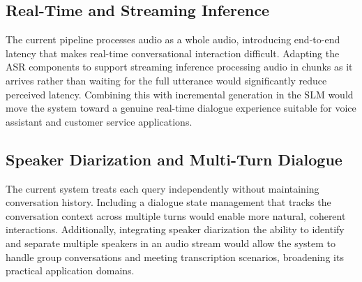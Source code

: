 \subsection{Real-Time and Streaming Inference}
The current pipeline processes audio as a whole audio, introducing end-to-end latency that makes real-time conversational interaction difficult. Adapting the ASR components to support streaming inference processing audio in chunks as it arrives rather than waiting for the full utterance would significantly reduce perceived latency. Combining this with incremental generation in the SLM would move the system toward a genuine real-time dialogue experience suitable for voice assistant and customer service applications.

\subsection{Speaker Diarization and Multi-Turn Dialogue}
The current system treats each query independently without maintaining conversation history. Including a dialogue state management that tracks the conversation context across multiple turns would enable more natural, coherent interactions. Additionally, integrating speaker diarization the ability to identify and separate multiple speakers in an audio stream would allow the system to handle group conversations and meeting transcription scenarios, broadening its practical application domains.